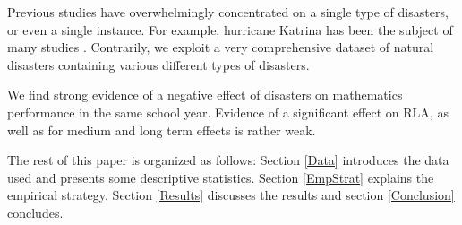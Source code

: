 Previous studies have overwhelmingly concentrated on a single type of disasters, or even a single instance. For example, hurricane Katrina has been the subject of many studies \citep[e.g.][]{Sacerdote_2012, Deryugina_2018}. Contrarily, we exploit a very comprehensive dataset of natural disasters containing various different types of disasters. 

We find strong evidence of a negative effect of disasters on mathematics performance in the same school year. Evidence of a significant effect on RLA, as well as for medium and long term effects is rather weak.

The rest of this paper is organized as follows: Section \ref{Data} introduces the data used and presents some descriptive statistics. Section \ref{EmpStrat} explains the empirical strategy. Section \ref{Results} discusses the results and section \ref{Conclusion} concludes.

